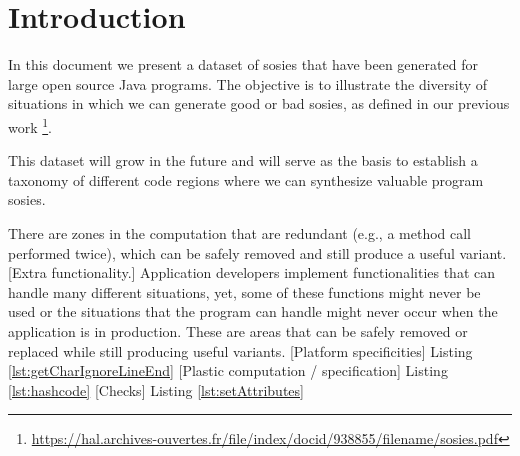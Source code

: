 \section{Introduction}

In this document we present a dataset of sosies that have been generated for large open source Java programs. 
The objective is to illustrate the diversity of situations in which we can generate good or bad sosies, as defined in our previous work \footnote{\url{https://hal.archives-ouvertes.fr/file/index/docid/938855/filename/sosies.pdf}}. 

This dataset will grow in the future and will serve as the basis to establish a taxonomy of different code regions where we can synthesize valuable program sosies. 

\begin{description}
   There are zones in the computation that are redundant (e.g., a method call performed twice), which can be safely removed and still produce a useful variant.
  [Extra functionality.] Application developers implement functionalities that can handle many different situations, yet, some of these functions might never be used or the situations that the program can handle might never occur when the application is in production. These are areas that can be safely removed or replaced while still producing useful variants.
  [Platform specificities] Listing \ref{lst:getCharIgnoreLineEnd}
  [Plastic computation / specification] Listing \ref{lst:hashcode}
  [Checks] Listing \ref{lst:setAttributes}
\end{description}